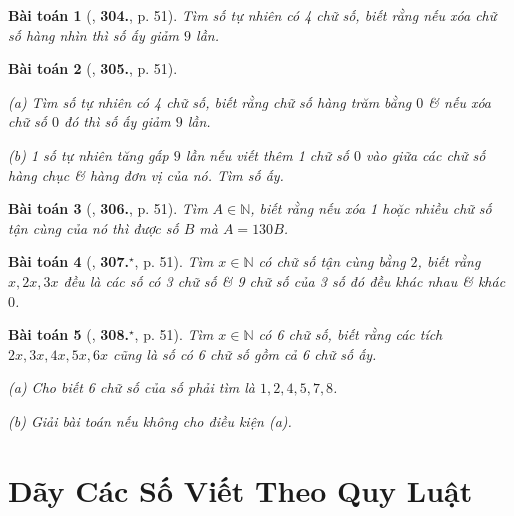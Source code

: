 \documentclass{article}
\numberwithin{equation}{section}
\newtheorem{baitoan}{Bài toán}
\begin{document}
\begin{baitoan}[\cite{Binh_Toan_6_tap_1}, \textbf{304.}, p. 51]
	Tìm số tự nhiên có 4 chữ số, biết rằng nếu xóa chữ số hàng nhìn thì số ấy giảm $9$ lần.
\end{baitoan}

\begin{baitoan}[\cite{Binh_Toan_6_tap_1}, \textbf{305.}, p. 51]
	\begin{enumerate*}
		\item[(a)] Tìm số tự nhiên có 4 chữ số, biết rằng chữ số hàng trăm bằng $0$ \& nếu xóa chữ số $0$ đó thì số ấy giảm $9$ lần.
		\item[(b)] 1 số tự nhiên tăng gấp $9$ lần nếu viết thêm 1 chữ số $0$ vào giữa các chữ số hàng chục \& hàng đơn vị của nó. Tìm số ấy.
	\end{enumerate*}	
\end{baitoan}

\begin{baitoan}[\cite{Binh_Toan_6_tap_1}, \textbf{306.}, p. 51]
	Tìm $A\in\mathbb{N}$, biết rằng nếu xóa 1 hoặc nhiều chữ số tận cùng của nó thì được số $B$ mà $A = 130B$.
\end{baitoan}

\begin{baitoan}[\cite{Binh_Toan_6_tap_1}, \textbf{307.}${}^\star$, p. 51]
	Tìm $x\in\mathbb{N}$ có chữ số tận cùng bằng $2$, biết rằng $x,2x,3x$ đều là các số có 3 chữ số \& 9 chữ số của 3 số đó đều khác nhau \& khác $0$.
\end{baitoan}

\begin{baitoan}[\cite{Binh_Toan_6_tap_1}, \textbf{308.}${}^\star$, p. 51]
	Tìm $x\in\mathbb{N}$ có 6 chữ số, biết rằng các tích $2x,3x,4x,5x,6x$ cũng là số có 6 chữ số gồm cả 6 chữ số ấy.
	\begin{enumerate*}
		\item[(a)] Cho biết 6 chữ số của số phải tìm là $1,2,4,5,7,8$.
		\item[(b)] Giải bài toán nếu không cho điều kiện (a).
	\end{enumerate*}
\end{baitoan}


\section{Dãy Các Số Viết Theo Quy Luật}
\end{document}
